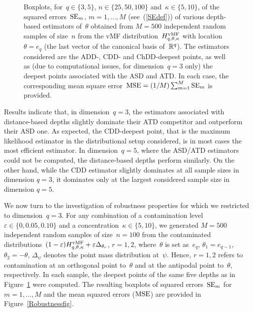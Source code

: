 \documentclass[usenames,dvipsnames]{article}
\begin{document}
\begin{figure}[h!]
\captionsetup{font=scriptsize} 
\begin{center}  
\end{center}
\vspace{-5mm}
\caption{Boxplots, for~$q\in\{3,5\}$, $n\in\{25,50,100\}$ and~$\kappa\in\{5,10\}$, of the squared errors~${\rm SE}_{m}$, $m=1,\ldots,M$ (see~(\ref{SEdef})) of various depth-based estimators of~$\theta$ obtained from $M=500$ independent random samples of size~$n$ from the vMF distribution~$H^{\rm vMF}_{q,\theta,\kappa}$ with location~$\theta=e_q$ (the last vector of the canonical basis of~$\mathbb{R}^q$). The estimators considered are the ADD-, CDD- and ChDD-deepest points, as well as (due to computational issues, for dimension~$q=3$ only) the deepest points associated with the ASD and ATD. In each case, the corresponding mean square error~${\rm MSE} = (1/M) \sum_{m=1}^M {\rm SE}_{m}$ is provided.} 
\label{Efficiencyfig}
\end{figure}

Results indicate that, in dimension~$q=3$, the estimators associated with distance-based depths slightly dominate their ATD competitor and outperform their ASD one. As expected, the CDD-deepest point, that is the maximum likelihood estimator in the distributional setup considered, is in most cases the most efficient estimator. 
In dimension~$q=5$, where the ASD/ATD estimators could not be computed, the distance-based depths perform similarly. On the other hand, while the CDD estimator slightly dominates at all sample sizes in dimension $q = 3$, it dominates only at the largest considered sample size in dimension $q=5$.

We now turn to the investigation of robustness properties for which we restricted to dimension~$q=3$. For any combination of a contamination level~$\varepsilon\in\{0,0.05,0.10\}$ and a concentration~$\kappa\in\{5,10\}$, we generated $M=500$ independent random samples of size~$n=100$ from the contaminated distributions~$(1-\varepsilon)H^{\rm vMF}_{q,\theta,\kappa}+\varepsilon \Delta_{\theta_r}$, $r=1,2$, where~$\theta$ is set as~$e_q$, $\theta_1=e_{q-1}$, $\theta_2=-\theta$, $\Delta_{\psi}$ denotes the point mass distribution at~$\psi$. Hence, $r=1,2$ refers to contamination at an orthogonal point to~$\theta$ and at the antipodal point to~$\theta$, respectively. In each sample, the deepest points of the same five depths as in Figure~\ref{Efficiencyfig} were computed. The resulting boxplots of squared errors~${\rm SE}_m$ for $m=1,\ldots,M$ and the mean squared errors (${\rm MSE}$) are provided in Figure~\ref{Robustnessfig}. 
\end{document}
